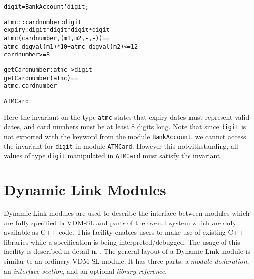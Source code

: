 \documentclass[\pformat,12pt]{article}
\begin{document}
\begin{description}
\begin{alltt}
    digit = BankAccount`digit;

    atmc:: cardnumber :  digit
           expiry : digit * digit * digit * digit
    atmc(cardnumber, (m1,m2,-,-)) ==
        atmc_digval(m1) * 10 + atmc_digval(m2) <= 12 
         cardnumber >= 8


    getCardnumber : atmc ->  digit
    getCardnumber (atmc) ==
      atmc.cardnumber

 ATMCard
\end{alltt}
Here the invariant on the type \texttt{atmc} states that expiry dates
must represent valid dates, and card numbers must be at least 8 digits
long. Note that since \texttt{digit} is not exported with the
 keyword from the module \texttt{BankAccount}, we cannot
access the invariant for \texttt{digit} in module
\texttt{ATMCard}. However this notwithstanding, all values of type
\texttt{digit} manipulated in \texttt{ATMCard} must satisfy the
invariant. 

\end{description}

\section{Dynamic Link Modules}\label{sec:DLmodules}

Dynamic Link modules are used to describe the interface between
modules which are fully specified in VDM-SL and parts of the overall
system which are only available as C++ code. This facility enables
users to make use of existing C++ libraries while a specification is
being interpreted/debugged. The usage of this facility
is described in detail in \cite{DLMan-SCSK}. The general layout of a Dynamic Link
module is similar to an ordinary VDM-SL module. It has three parts: a
\emph{module declaration}, an \emph{interface section}, and an
optional \emph{library reference}. 
\end{document}
